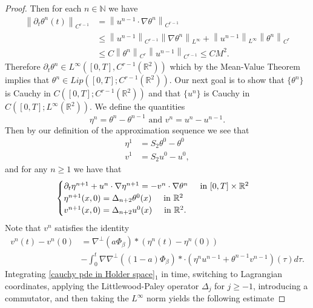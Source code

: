 \documentclass[12pt,xcolor=svgnames]{amsart}
\newcommand{\R}{\mathbb{R}}
\newcommand{\norm}[2]{\left\lVert#1\right\rVert_{#2}}
\begin{document}
\begin{proof}
Then for each $n \in \mathbb{N}$ we have
\begin{align*}
\norm{\partial_t\theta^n(t)}{C^{r-1}} &= \norm{u^{n-1}\cdot\nabla\theta ^n}{C^{r-1}}\\
&\leq \norm{u^{n-1}}{C^{r-1}}\norm{\nabla \theta^{n}}{L^{\infty}} + \norm{u^{n-1}}{L^{\infty}}\norm{\theta^{n}}{C^r}\\
&\leq C \norm{\theta^n}{C^r}\norm{u^{n-1}}{C^{r-1}} \leq CM^2.
\end{align*}
Therefore $\partial_t \theta^n \in L^{\infty}([0,T], C^{r-1}(\R^2))$ which by the Mean-Value Theorem implies that $\theta^n \in Lip([0,T]; C^{r-1}(\R^2))$. Our next goal is to show that $\{\theta^n\}$ is Cauchy in $C([0,T];C^{r-1}(\R^2))$ and that $\{u^n\}$ is Cauchy in $C([0,T];L^{\infty}(\R^2))$. We define the quantities
$$
\eta^n=\theta^n-\theta^{n-1} \text{ and } v^n=u^n-u^{n-1}.
$$
Then by our definition of the approximation sequence we see that 
\begin{align*} \eta^1 &= S_2\theta^0 - \theta^0\\
v^1 &= S_2u^0-u^0,
\end{align*}
and for any $n \geq 1$ we have that 
\begin{equation}
\label{cauchy pde in Holder space}
\begin{cases}
\partial_t \eta^{n+1}+u^n\cdot \nabla \eta^{n+1} = -v^n\cdot \nabla \theta^n \hspace{.5cm} \text{in } [0,T] \times \R^2\\
\eta^{n+1}(x,0) = \Delta_{n+2}\theta^0(x) \hspace{.5cm} \text{in } \R^2\\
v^{n+1}(x,0)=\Delta_{n+2}u^0(x) \hspace{.5cm} \text{in } \R^2.
\end{cases}
\end{equation}
Note that $v^n$ satisfies the identity
\begin{align}
\label{cauchy serfati identity in Holder space}
v^n(t) - v^n(0) &= \nabla^{\perp}(a\Phi_{\beta})\ast (\eta^n(t) -\eta^n(0))\nonumber \\ &- \int_0^t \nabla\nabla^{\perp}((1-a)\Phi_{\beta}) \ast\cdot(\eta^nu^{n-1}+\theta^{n-1}v^{n-1})(\tau)d\tau.
\end{align}
Integrating \eqref{cauchy pde in Holder space}$_1$ in time, switching to Lagrangian coordinates,  applying the Littlewood-Paley operator $\Delta_j$ for $j \geq -1$, introducing a commutator, and then taking the $L^{\infty}$ norm yields the following estimate

\end{proof}
\end{document}
